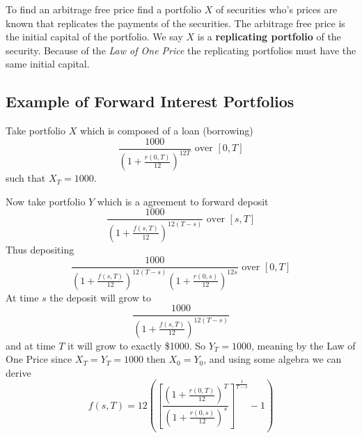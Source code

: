 \documentclass[12pt,letterpaper, twocolumn]{article}
\begin{document}
To find an arbitrage free price find a portfolio $X$ of securities who's prices are known that replicates the payments of the securities. The arbitrage free price is the initial capital of the portfolio. We say $X$ is a \textbf{replicating portfolio} of the security. Because of the \textit{Law of One Price} the replicating portfolios must have the same initial capital. 

\subsection*{Example of Forward Interest Portfolios}
Take portfolio $X$ which is composed of a loan (borrowing) 
\[ \frac{1000}{\left( 1+ \frac{r(0,T)}{12} \right)^{12T}} \text{ over } [0,T] \]
such that $X_T = 1000$. 

Now take portfolio $Y$ which is a agreement to forward deposit 
\[ \frac{1000}{\left( 1+ \frac{f(s,T)}{12} \right)^{12(T-s)}} \text{ over } [s,T] \]
Thus depositing 
\[ \frac{1000}{\left( 1+ \frac{f(s,T)}{12} \right)^{12(T-s)}\left( 1+ \frac{r(0,s)}{12} \right)^{12s}} \text{ over } [0,T] \]
At time $s$ the deposit will grow to
\[ \frac{1000}{\left( 1+ \frac{f(s,T)}{12} \right)^{12(T-s)}}\]
and at time $T$ it will grow to exactly \$1000. 
So $Y_T = 1000$, meaning by the Law of One Price since $X_T = Y_T=1000$ then $X_0 = Y_0$, and using some algebra we can derive
\[
    f(s,T) = 12{\left( \left[ \frac{(1+ \frac{r(0,T)}{12})^T}{(1+ \frac{r(0,s)}{12})^s} \right]^{\frac{1}{T-s}}-1 \right)}
\]
\end{document}
